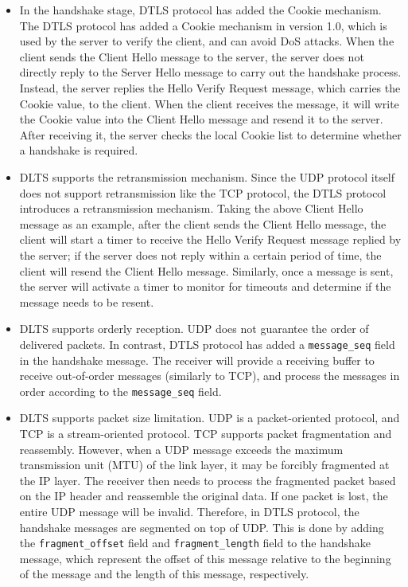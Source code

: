 \documentclass[a4paper,12pt,openany]{book}
\begin{document}
\begin{itemize}[leftmargin=1.5em]
    \item In the handshake stage, DTLS protocol has added the Cookie mechanism. The DTLS protocol has added a Cookie mechanism in version 1.0, which is used by the server to verify the client, and can avoid DoS attacks. When the client sends the Client Hello message to the server, the server does not directly reply to the Server Hello message to carry out the handshake process. Instead, the server replies the Hello Verify Request message, which carries the Cookie value, to the client. When the client receives the message, it will write the Cookie value into the Client Hello message and resend it to the server. After receiving it, the server checks the local Cookie list to determine whether a handshake is required.
    \item DLTS supports the retransmission mechanism. Since the UDP protocol itself does not support retransmission like the TCP protocol, the DTLS protocol introduces a retransmission mechanism. Taking the above Client Hello message as an example, after the client sends the Client Hello message, the client will start a timer to receive the Hello Verify Request message replied by the server; if the server does not reply within a certain period of time, the client will resend the Client Hello message. Similarly, once a message is sent, the server will activate a timer to monitor for timeouts and determine if the message needs to be resent.
    \item DLTS supports orderly reception. UDP does not guarantee the order of delivered packets. In contrast, DTLS protocol has added a \verb|message_seq| field in the handshake message. The receiver will provide a receiving buffer to receive out-of-order messages (similarly to TCP), and process the messages in order according to the \verb|message_seq| field.
    \item DLTS supports packet size limitation. UDP is a packet-oriented protocol, and TCP is a stream-oriented protocol. TCP supports packet fragmentation and reassembly. However, when a UDP message exceeds the maximum transmission unit (MTU) of the link layer, it may be forcibly fragmented at the IP layer. The receiver then needs to process the fragmented packet based on the IP header and reassemble the original data. If one packet is lost, the entire UDP message will be invalid. Therefore, in DTLS protocol, the handshake messages are segmented on top of UDP. This is done by adding the \verb|fragment_offset| field and \verb|fragment_length| field to the handshake message, which represent the offset of this message relative to the beginning of the message and the length of this message, respectively. 
\end{itemize}
\end{document}
